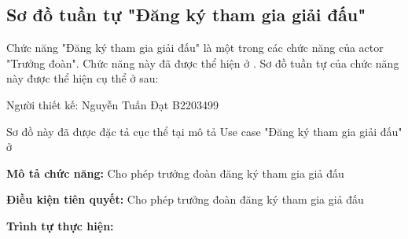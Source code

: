 \subsection{Sơ đồ tuần tự "Đăng ký tham gia giải đấu"}
\setcounter{figure}{0}

Chức năng "Đăng ký tham gia giải đấu" là một trong các chức năng của actor "Trưởng đoàn".
Chức năng này đã được thể hiện ở .
Sơ đồ tuần tự của chức năng này được thể hiện cụ thể ở \myref{} sau:

Người thiết kế: Nguyễn Tuấn Đạt B2203499

Sơ đồ này đã được đặc tả cục thể tại mô tả Use case
"Đăng ký tham gia giải đấu" ở 

\noindent
\textbf{Mô tả chức năng:} Cho phép trưởng đoàn đăng ký tham gia giả đấu

\noindent
\textbf{Điều kiện tiên quyết:} Cho phép trưởng đoàn đăng ký tham gia giả đấu

\noindent
\textbf{Trình tự thực hiện:}

